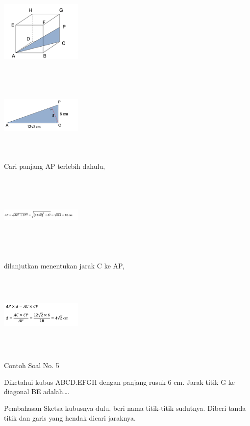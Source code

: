 \documentclass[11pt,fleqn]{book} %
\begin{document}
\includegraphics[width = 4cm, height= 4cm]{Pictures/gi21.png}

\includegraphics[width = 4cm, height= 4cm]{Pictures/gi22.png}

Cari panjang AP terlebih dahulu, 

\includegraphics[width = 4cm, height= 4cm]{Pictures/gi23.png}

dilanjutkan menentukan jarak C ke AP,

\includegraphics[width = 4cm, height= 4cm]{Pictures/gi24.png}

Contoh Soal No. 5

Diketahui kubus ABCD.EFGH dengan panjang rusuk 6 cm. Jarak titik G ke diagonal BE adalah….

Pembahasan
Sketsa kubusnya dulu, beri nama titik-titik sudutnya. Diberi tanda titik dan garis yang hendak dicari jaraknya. 
\end{document}
